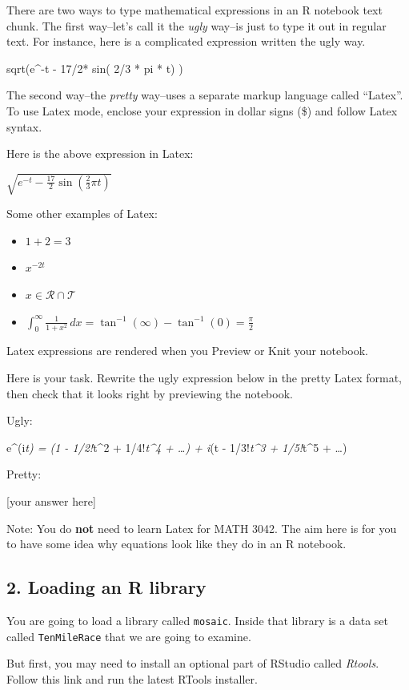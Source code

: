 \documentclass[
]{article}
\begin{document}
There are two ways to type mathematical expressions in an R notebook
text chunk. The first way--let's call it the \emph{ugly} way--is just to
type it out in regular text. For instance, here is a complicated
expression written the ugly way.

sqrt(e\^{}-t - 17/2* sin( 2/3 * pi * t) )

The second way--the \emph{pretty} way--uses a separate markup language
called ``Latex''. To use Latex mode, enclose your expression in dollar
signs (\$) and follow Latex syntax.

Here is the above expression in Latex:

\(\sqrt{e^{-t} - \frac{17}{2}\sin\left( \frac{2}{3}\pi t \right)}\)

Some other examples of Latex:

\begin{itemize}
\item
  \(1 + 2 = 3\)
\item
  \(x^{-2t}\)
\item
  \(x \in \mathcal{R} \cap \mathcal{T}\)
\item
  \(\int_0^\infty \frac{1}{1+x^2}\,dx = \tan^{-1}(\infty) - \tan^{-1}(0) = \frac{\pi}{2}\)
\end{itemize}

Latex expressions are rendered when you Preview or Knit your notebook.

Here is your task. Rewrite the ugly expression below in the pretty Latex
format, then check that it looks right by previewing the notebook.

Ugly:

e\^{}(i\emph{t) = (1 - 1/2!}t\^{}2 + 1/4!\emph{t\^{}4 + \ldots) + i}(t -
1/3!\emph{t\^{}3 + 1/5!}t\^{}5 + \ldots)

Pretty:

{[}your answer here{]}

Note: You do \textbf{not} need to learn Latex for MATH 3042. The aim
here is for you to have some idea why equations look like they do in an
R notebook.

\subsection{2. Loading an R library}\label{loading-an-r-library}

You are going to load a library called \texttt{mosaic}. Inside that
library is a data set called \texttt{TenMileRace} that we are going to
examine.

But first, you may need to install an optional part of RStudio called
\emph{Rtools}. Follow this link and run the latest RTools installer.
\end{document}
